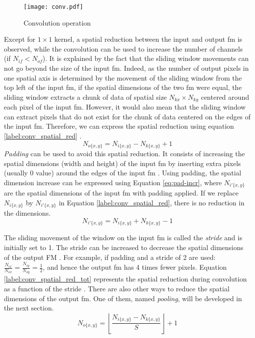 %
\begin{figure}[H]
    \centering
    \texttt{[image: conv.pdf]}
    \caption{Convolution operation}
    \label{fig:convolution}
\end{figure}
%
Except for $1 \times 1$ kernel, a spatial reduction between the input and output \acrshort{fm} is observed, while the convolution can be used to increase the number of channels (if $N_{if} < N_{of}$). It is explained by the fact that the sliding window movements can not go beyond the size of the input \acrshort{fm}. Indeed, as the number of output pixels in one spatial axis is determined by the movement of the sliding window from the top left of the input \acrshort{fm}, if the spatial dimensions of the two \acrshort{fm} were equal, the sliding window extracts a chunk of data of spatial size $N_{kx} \times N_{ky}$ centered around each pixel of the input \acrshort{fm}. However, it would also mean that the sliding window can extract pixels that do not exist for the chunk of data centered on the edges of the input \acrshort{fm}. Therefore, we can express the spatial reduction using equation \eqref{label:conv_spatial_red} \cite{ma_optimizing_2018}.
%
\begin{equation}
    N_{o\{x,y\}} = N_{i\{x,y\}} - N_{k\{x,y\}} + 1
    \label{label:conv_spatial_red}
\end{equation}
%
\textit{Padding} can be used to avoid this spatial reduction. It consists of increasing the spatial dimensions (width and height) of the input \acrshort{fm} by inserting extra pixels (usually 0 value) around the edges of the input \acrshort{fm} \cite{liu_fpga-based_2019}. Using padding, the spatial dimension increase can be expressed using Equation \eqref{eq:pad-incr}, where $N_{i'\{x,y\}}$ are the spatial dimensions of the input \acrshort{fm} with padding applied. If we replace $N_{i\{x,y\}}$ by $N_{i'\{x,y\}}$ in Equation \eqref{label:conv_spatial_red}, there is no reduction in the dimensions.
%
\begin{equation}
    N_{i'\{x,y\}} = N_{i\{x,y\}} + N_{k\{x,y\}} - 1
    \label{eq:pad-incr}
\end{equation}

The sliding movement of the window on the input \acrshort{fm} is called the \textit{stride} and is initially set to 1. The stride can be increased to decrease the spatial dimensions of the output FM \cite{liu_fpga-based_2019}. For example, if padding and a stride of 2 are used: $\frac{N_{ix}}{N_{ox}} = \frac{N_{iy}}{N_{oy}} = \frac{1}{2}$, and hence the output \acrshort{fm} has 4 times fewer pixels. Equation \eqref{label:conv_spatial_red_tot} represents the spatial reduction during convolution as a function of the stride \cite{ma_optimizing_2018}. There are also other ways to reduce the spatial dimensions of the output \acrshort{fm}. One of them, named \textit{pooling}, will be developed in the next section.
%
\begin{equation}
    N_{o\{x,y\}} = \left\lfloor \frac{ N_{i\{x,y\}} - N_{k\{x,y\}}}{S} \right\rfloor + 1
    \label{label:conv_spatial_red_tot}
\end{equation}

